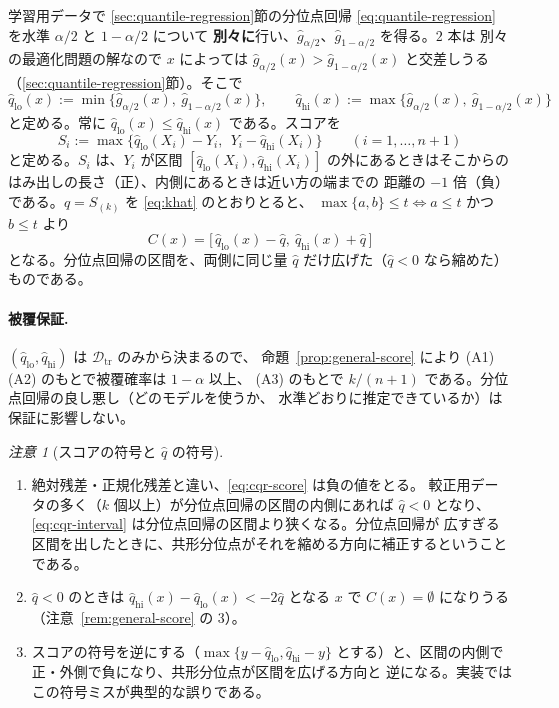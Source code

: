 \documentclass[a4paper,11pt]{jsarticle}
\theoremstyle{definition}
\theoremstyle{plain}
\theoremstyle{remark}
\newtheorem{remark}[definition]{注意}
\newcommand{\Dtr}{\mathcal{D}_{\mathrm{tr}}}     %
\newcommand{\qhat}{\hat{q}}
\begin{document}
学習用データで \ref{sec:quantile-regression}節の分位点回帰
\eqref{eq:quantile-regression} を水準 $\alpha/2$ と $1-\alpha/2$ について
\textbf{別々に}行い、$\hat g_{\alpha/2}$、$\hat g_{1-\alpha/2}$ を得る。$2$ 本は
別々の最適化問題の解なので $x$ によっては $\hat g_{\alpha/2}(x)>\hat g_{1-\alpha/2}(x)$
と交差しうる（\ref{sec:quantile-regression}節）。そこで
\begin{equation}
  \label{eq:cqr-pair}
  \qhat_{\mathrm{lo}}(x):=\min\{\hat g_{\alpha/2}(x),\ \hat g_{1-\alpha/2}(x)\},\qquad
  \qhat_{\mathrm{hi}}(x):=\max\{\hat g_{\alpha/2}(x),\ \hat g_{1-\alpha/2}(x)\}
\end{equation}
と定める。常に $\qhat_{\mathrm{lo}}(x)\le\qhat_{\mathrm{hi}}(x)$ である。スコアを
\begin{equation}
  \label{eq:cqr-score}
  S_i:=\max\bigl\{\qhat_{\mathrm{lo}}(X_i)-Y_i,\ \ Y_i-\qhat_{\mathrm{hi}}(X_i)\bigr\}
  \qquad(i=1,\dots,n+1)
\end{equation}
と定める。$S_i$ は、$Y_i$ が区間 $[\qhat_{\mathrm{lo}}(X_i),\qhat_{\mathrm{hi}}(X_i)]$
の外にあるときはそこからのはみ出しの長さ（正）、内側にあるときは近い方の端までの
距離の $-1$ 倍（負）である。$\qhat=S_{(k)}$ を \eqref{eq:khat} のとおりとると、
$\max\{a,b\}\le t\iff a\le t$ かつ $b\le t$ より
\begin{equation}
  \label{eq:cqr-interval}
  C(x)=\bigl[\,\qhat_{\mathrm{lo}}(x)-\qhat,\ \qhat_{\mathrm{hi}}(x)+\qhat\,\bigr]
\end{equation}
となる。分位点回帰の区間を、両側に同じ量 $\qhat$ だけ広げた（$\qhat<0$ なら縮めた）
ものである。

\paragraph{被覆保証.}
$(\qhat_{\mathrm{lo}},\qhat_{\mathrm{hi}})$ は $\Dtr$ のみから決まるので、
命題~\ref{prop:general-score} により (A1)(A2) のもとで被覆確率は $1-\alpha$ 以上、
(A3) のもとで $k/(n+1)$ である。分位点回帰の良し悪し（どのモデルを使うか、
水準どおりに推定できているか）は保証に影響しない。

\begin{remark}[スコアの符号と $\qhat$ の符号]
  \label{rem:cqr-negative}
  \leavevmode
  \begin{enumerate}
    \item 絶対残差・正規化残差と違い、\eqref{eq:cqr-score} は負の値をとる。
      較正用データの多く（$k$ 個以上）が分位点回帰の区間の内側にあれば $\qhat<0$
      となり、\eqref{eq:cqr-interval} は分位点回帰の区間より狭くなる。分位点回帰が
      広すぎる区間を出したときに、共形分位点がそれを縮める方向に補正するということ
      である。
    \item $\qhat<0$ のときは $\qhat_{\mathrm{hi}}(x)-\qhat_{\mathrm{lo}}(x)<-2\qhat$
      となる $x$ で $C(x)=\emptyset$ になりうる（注意~\ref{rem:general-score} の 3）。
    \item スコアの符号を逆にする（$\max\{y-\qhat_{\mathrm{lo}},\qhat_{\mathrm{hi}}-y\}$
      とする）と、区間の内側で正・外側で負になり、共形分位点が区間を広げる方向と
      逆になる。実装ではこの符号ミスが典型的な誤りである。
  \end{enumerate}
\end{remark}
\end{document}
